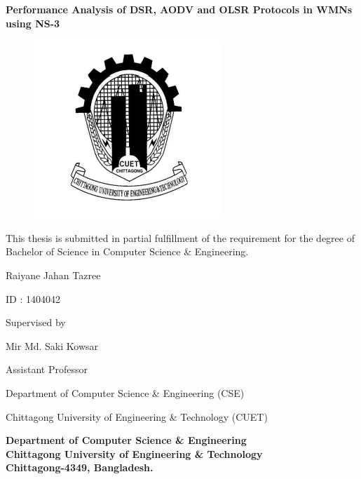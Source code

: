 \begin{center}
\textbf{{\large Performance Analysis of DSR, AODV and OLSR Protocols in WMNs using NS-3} }
\end{center}


\begin{figure}[hbtp]
\Centering
\includegraphics[scale=.75]{cuet-logo.png}
\end{figure}




\begin{center}
This thesis is submitted in partial fulfillment of the requirement for the degree of 
Bachelor of Science in Computer Science \& Engineering. \newline
\end{center}

\begin{center}
Raiyane Jahan Tazree
\end{center}

\begin{center}
ID : 1404042
\end{center}


\vspace{20mm}

\begin{center}
Supervised by \

Mir Md. Saki Kowsar \

Assistant Professor \

Department of Computer Science \& Engineering (CSE) \

Chittagong University of Engineering \& Technology (CUET)
\end{center}




\vfill
\begin{center}
\textbf{{\large Department of Computer Science \& Engineering} \\
{\normalsize Chittagong University of Engineering \& Technology} \\
{\small Chittagong-4349, Bangladesh.}}
\end{center}

